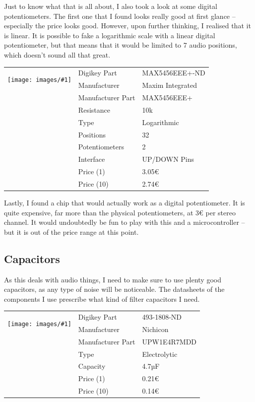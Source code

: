 \documentclass[a4paper]{article}
\makeatletter
\newenvironment{partdisplay}[1]{
\begin{center}
\begin{tabular}{@{}p{3cm}p{3cm}p{4.5cm}@{}}
\multirow{2}{3cm}{\texttt{[image: images/\#1]}}}{
\end{tabular}
\end{center}}
\makeatother
\begin{document}
Just to know what that is all about, I also took a look at some digital potentiometers. The first one that I found looks really good at first glance -- especially the price looks good. However, upon further thinking, I realised that it is linear. It is possible to fake a logarithmic scale with a linear digital potentiometer, but that means that it would be limited to 7 audio positions, which doesn't sound all that great.

\begin{partdisplay}{175-16-QSOP}
& Digikey Part & MAX5456EEE+-ND\\
& Manufacturer & Maxim Integrated\\
& Manufacturer Part & MAX5456EEE+\\
& Resistance & 10k\\
& Type & Logarithmic\\
& Positions & 32\\
& Potentiometers & 2\\
& Interface & UP/DOWN Pins\\
& Price (1) & 3.05€\\
& Price (10) & 2.74€\\
\end{partdisplay}

Lastly, I found a chip that would actually work as a digital potentiometer. It is quite expensive, far more than the physical potentiometers, at 3€ per stereo channel. It would undoubtedly be fun to play with this and a microcontroller -- but it is out of the price range at this point.

\subsection{Capacitors}

As this deals with audio things, I need to make sure to use plenty good capacitors, as any type of noise will be noticeable. The datasheets of the components I use prescribe what kind of filter capacitors I need.

\begin{partdisplay}{nichion47cap}
& Digikey Part & 493-1808-ND\\
& Manufacturer & Nichicon\\
& Manufacturer Part & UPW1E4R7MDD\\
& Type & Electrolytic\\
& Capacity & 4.7µF\\
& Price (1) & 0.21€\\
& Price (10) & 0.14€\\  
\end{partdisplay}
\end{document}
